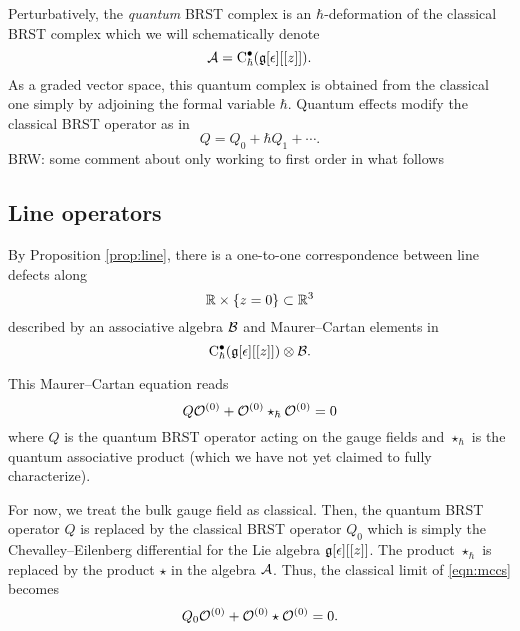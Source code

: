 \documentclass[11pt]{amsart}
\def\brian#1{{\textcolor{blue!65!red}{BRW: {#1}}}}
\begin{document}

%
%

Perturbatively, the {\em quantum} BRST complex is an $\hbar$-deformation of the classical BRST complex which we will schematically denote
\[
\mathcal A = {\rm C}^\bullet_\hbar (\mathfrak g[\epsilon][[z]])  .
\]
As a graded vector space, this quantum complex is obtained from the classical one simply by adjoining the formal variable $\hbar$. 
Quantum effects modify the classical BRST operator as in
\[
Q = Q_0 + \hbar Q_1 + \cdots .
\]
\brian{some comment about only working to first order in what follows}

\subsection{Line operators}

By Proposition \ref{prop:line}, there is a one-to-one correspondence between line defects along
\[
\mathbb R \times \{z=0\} \subset \mathbb R^3 
\]
described by an associative algebra $\mathcal B$ and Maurer--Cartan elements in 
\begin{equation}\label{eqn:criticalobs}
{\rm C}_\hbar^\bullet(\mathfrak g[\epsilon][[z]]) \otimes \mathcal B .
\end{equation}

This Maurer--Cartan equation reads
\begin{equation}\label{eqn:mccs}
Q \mathcal O^{(0)} + \mathcal O^{(0)} \star_\hbar \mathcal O^{(0)} = 0 
\end{equation}
where $Q$ is the quantum BRST operator acting on the gauge fields and $\star_\hbar$ is the quantum associative product (which we have not yet claimed to fully characterize). 

For now, we treat the bulk gauge field as classical.
Then, the quantum BRST operator $Q$ is replaced by the classical BRST operator $Q_0$ which is simply the Chevalley--Eilenberg differential for the Lie algebra $\mathfrak g[\epsilon][[z]]$.
The product $\star_\hbar$ is replaced by the product $\star$ in the algebra $\mathcal A$. 
Thus, the classical limit of \eqref{eqn:mccs} becomes
\begin{equation}\label{eqn:cmccs}
Q_0 \mathcal O^{(0)} + \mathcal O^{(0)} \star \mathcal O^{(0)} = 0 .
\end{equation}
\end{document}
